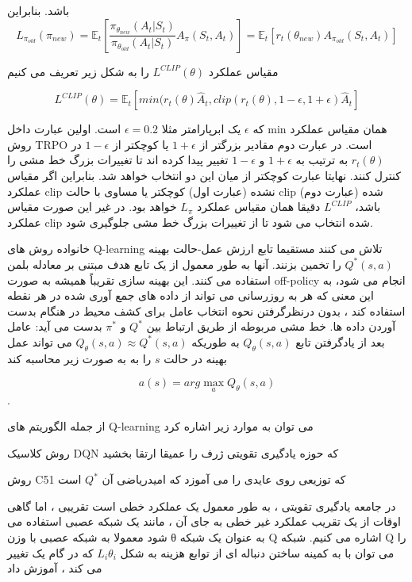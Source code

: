 باشد. بنابراین
$$L_{\pi_{old}}(\pi_{new}) = \mathbb{E}_t\left[\dfrac{\pi_{\theta_{new}}(A_t| S_t)}{\pi_{\theta_{old}}(A_t|S_t)} A_{\pi}(S_t, A_t)\right] = \mathbb{E}_t\left[r_t(\theta_{new}) A_{\pi_{old}}(S_t,A_t)\right]$$

مقیاس عملکرد 
$L^{CLIP}(\theta)$
را به شکل زیر تعریف می کنیم

$$L^{CLIP}(\theta) = \mathbb{E}_t\left[min(r_t(\theta) \hat{A}_t, clip(r_t(\theta), 1-\epsilon, 1+\epsilon) \hat{A}_t \right]$$

که $\epsilon$ یک ابرپارامتر  مثلا 
$\epsilon=0.2$
است. اولین عبارت داخل min همان مقیاس عملکرد روش TRPO است. در عبارت دوم مقادیر بزرگتر از $1+\epsilon$ یا کوچکتر از 
$1-\epsilon$
در $r_t(\theta)$ به ترتیب به $1+\epsilon$ و $1-\epsilon$ تغییر پیدا کرده اند تا تغییرات بزرگ خط مشی را کنترل کنند. نهایتا عبارت کوچکتر از میان این دو انتخاب خواهد شد. بنابراین اگر مقیاس عملکرد clip نشده (عبارت اول) کوچکتر یا مساوی با حالت clip شده (عبارت دوم) باشد، $L^{CLIP}$ دقیقا همان مقیاس عملکرد $L_\pi$ خواهد بود. در غیر این صورت مقیاس عملکرد clip شده انتخاب می شود تا از تغییرات بزرگ خط مشی جلوگیری شود.



خانواده روش های  Q-learning تلاش می کنند مستقیما تابع ارزش عمل-حالت بهینه $Q^*(s,a)$ را تخمین بزنند. آنها به طور معمول از یک تابع هدف مبتنی بر معادله بلمن استفاده می کنند. این بهینه سازی تقریباً همیشه به صورت off-policy انجام می شود، به این معنی که هر به روزرسانی می تواند از داده های جمع آوری شده در هر نقطه استفاده کند ، بدون درنظرگرفتن نحوه انتخاب عامل برای کشف محیط در هنگام بدست آوردن داده ها. خط مشی مربوطه از طریق ارتباط بین 
$Q^*$
و
$\pi^*$
 بدست می آید: عامل بعد از یادگرفتن تابع $Q_\theta(s,a)$ به طوریکه 
 $Q_\theta(s,a) \approx Q^*(s,a)$
می تواند عمل بهینه در حالت $s$ را به به صورت زیر محاسبه کند

$$a(s) = arg \max_a Q_{\theta}(s,a)$$.

از جمله الگوریتم های Q-learning می توان به موارد زیر اشاره کرد


روش کلاسیک DQN که حوزه یادگیری تقویتی ژرف را عمیقا ارتقا بخشید

روش C51 که توزیعی روی عایدی را می آموزد که امیدریاضی آن $Q^*$ است


در جامعه یادگیری تقویتی ، به طور معمول یک عملکرد خطی است
تقریبی ، اما گاهی اوقات از یک تقریب عملکرد غیر خطی به جای آن ، مانند یک شبکه عصبی استفاده می شود معمولا به شبکه عصبی با وزن θ به عنوان یک شبکه Q اشاره می کنیم.
شبکه Q را می توان با به کمینه ساختن دنباله ای از توابع هزینه به شکل 
$L_i{\theta_i}$
 که در گام یک تغییر می کند ، آموزش داد

